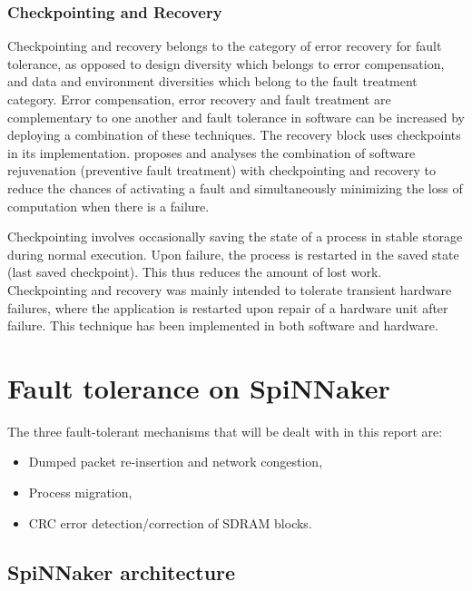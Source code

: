 \documentclass[a4paper, 11pt]{article}
\begin{document}
\subsubsection{Checkpointing and Recovery}
Checkpointing and recovery \citep{kulkarni1990effects} belongs to the category of error recovery for fault tolerance, as opposed to design diversity which belongs to error compensation, and data and environment diversities which belong to the fault treatment category. Error compensation, error recovery and fault treatment are complementary to one another and fault tolerance in software can be increased by deploying a combination of these techniques. The recovery block uses checkpoints in its implementation. \citet{garg1996minimizing} proposes and analyses the combination of software rejuvenation (preventive fault treatment) with checkpointing and recovery to reduce the chances of activating a fault and simultaneously minimizing the loss of computation when there is a failure.

Checkpointing involves occasionally saving the state of a process in stable storage during normal execution. Upon failure, the process is restarted in the saved state (last saved checkpoint). This thus reduces the amount of lost work. Checkpointing and recovery was mainly intended to tolerate transient hardware failures, where the application is restarted upon repair of a hardware unit after failure. This technique has been implemented in both software and hardware.

\clearpage
\section{Fault tolerance on SpiNNaker}
The three fault-tolerant mechanisms that will be dealt with in this report are:
\begin{itemize}
\item Dumped packet re-insertion and network congestion,
\item Process migration,
\item CRC error detection/correction of SDRAM blocks.
\end{itemize}

\subsection{SpiNNaker architecture}
\end{document}
